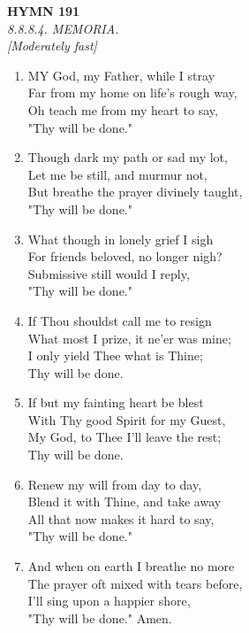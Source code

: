 \documentclass[11pt,a4paper]{article}
\begin{document}
\newpage
\begin{center}
    {\Large \textbf{HYMN 191}}
    \\
    \textit{8.8.8.4. MEMORIA.}
    \\
    \textit{\small [Moderately fast]}
\end{center}
\vspace{1em}

\begin{enumerate}
    \item MY God, my Father, while I stray \\
        Far from my home on life's rough way, \\
        Oh teach me from my heart to say, \\
        "Thy will be done."

    \item Though dark my path or sad my lot, \\
        Let me be still, and murmur not, \\
        But breathe the prayer divinely taught, \\
        "Thy will be done."

    \item What though in lonely grief I sigh \\
        For friends beloved, no longer nigh? \\
        Submissive still would I reply, \\
        "Thy will be done."

    \item If Thou shouldst call me to resign \\
        What most I prize, it ne'er was mine; \\
        I only yield Thee what is Thine; \\
        Thy will be done.

    \item If but my fainting heart be blest \\
        With Thy good Spirit for my Guest, \\
        My God, to Thee I'll leave the rest; \\
        Thy will be done.

    \item Renew my will from day to day, \\
        Blend it with Thine, and take away \\
        All that now makes it hard to say, \\
        "Thy will be done."

    \item And when on earth I breathe no more \\
        The prayer oft mixed with tears before, \\
        I'll sing upon a happier shore, \\
        "Thy will be done." Amen.

\end{enumerate}
\end{document}
